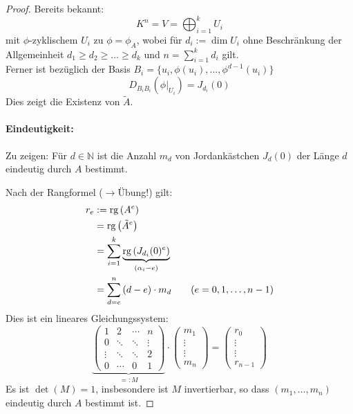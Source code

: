 \documentclass[parskip,a4paper,twoside,DIV15,BCOR12mm]{scrbook}
\begin{document}
\begin{proof}
Bereits bekannt:
\[
K^{n}=V=\bigoplus_{i=1}^{k}{U_{i}}
\]
mit \(\phi\)-zyklischem \(U_{i}\) zu \(\phi=\phi_{A}\), wobei für 
\(d_{i}:=\dim U_{i}\) ohne Beschränkung der Allgemeinheit 
\(d_{1}\geq d_{2}\geq\ldots\geq d_{k}\) und \(n=\sum_{i=1}^{k}{d_{i}}\) gilt.\\
Ferner ist bezüglich der Basis 
    \(B_{i}=\{u_{i},\phi(u_{i}),\ldots,\phi^{d-1}(u_{i})\}\)
\[
D_{B_{i}B_{i}}\left(\phi|_{U_{i}}\right)=J_{d_{i}}(0)
\]
Dies zeigt die Existenz von \(\tilde{A}\).
\paragraph{Eindeutigkeit:}{Zu zeigen: Für \(d\in\mathbb{N}\) ist die Anzahl
\(m_{d}\) von Jordankästchen \(J_{d}(0)\) der Länge \(d\) eindeutig durch
\(A\) bestimmt.

Nach der Rangformel (\(\longrightarrow\)\"Ubung!) gilt:
\begin{align*}
r_{e}&:=\operatorname{rg}\left(A^{e}\right)\\
&=\operatorname{rg}\left(\tilde{A}^{e}\right)\\
&=\sum_{i=1}^{k}{
    \underbrace{\operatorname{rg}\left(J_{d_{i}}(0)^{e}\right)}_{(\alpha_{i}-e)}}\\
&=\sum_{d=e}^{n}{(d-e)\cdot m_{d}}\qquad(e=0,1,\ldots,n-1)
\end{align*}
Dies ist ein lineares Gleichungssystem:
\[
\underbrace{\begin{pmatrix}
    1&2&\cdots&n\\
    0&\ddots&\ddots&\vdots\\
    \vdots&\ddots&\ddots&2\\
    0&\cdots&0&1
\end{pmatrix}}_{=:M}\cdot
\begin{pmatrix}
    m_{1}\\\vdots\\\vdots\\m_{n}
\end{pmatrix}=
\begin{pmatrix}
    r_{0}\\\vdots\\\vdots\\r_{n-1}
\end{pmatrix}
\]
Es ist \(\det(M)=1\), insbesondere ist \(M\) invertierbar, so dass 
\((m_{1},\ldots,m_{n})\) eindeutig durch \(A\) bestimmt ist.
}
\end{proof}
\end{document}
